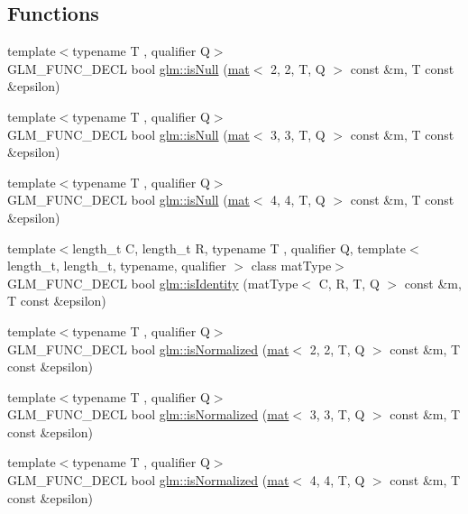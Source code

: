 \subsection*{Functions}
\begin{DoxyCompactItemize}
\item 
{\footnotesize template$<$typename T , qualifier Q$>$ }\\G\+L\+M\+\_\+\+F\+U\+N\+C\+\_\+\+D\+E\+CL bool \hyperlink{group__gtx__matrix__query_ga9790ec222ce948c0ff0d8ce927340dba}{glm\+::is\+Null} (\hyperlink{structglm_1_1mat}{mat}$<$ 2, 2, T, Q $>$ const \&m, T const \&epsilon)
\item 
{\footnotesize template$<$typename T , qualifier Q$>$ }\\G\+L\+M\+\_\+\+F\+U\+N\+C\+\_\+\+D\+E\+CL bool \hyperlink{group__gtx__matrix__query_gae14501c6b14ccda6014cc5350080103d}{glm\+::is\+Null} (\hyperlink{structglm_1_1mat}{mat}$<$ 3, 3, T, Q $>$ const \&m, T const \&epsilon)
\item 
{\footnotesize template$<$typename T , qualifier Q$>$ }\\G\+L\+M\+\_\+\+F\+U\+N\+C\+\_\+\+D\+E\+CL bool \hyperlink{group__gtx__matrix__query_ga2b98bb30a9fefa7cdea5f1dcddba677b}{glm\+::is\+Null} (\hyperlink{structglm_1_1mat}{mat}$<$ 4, 4, T, Q $>$ const \&m, T const \&epsilon)
\item 
{\footnotesize template$<$length\+\_\+t C, length\+\_\+t R, typename T , qualifier Q, template$<$ length\+\_\+t, length\+\_\+t, typename, qualifier $>$ class mat\+Type$>$ }\\G\+L\+M\+\_\+\+F\+U\+N\+C\+\_\+\+D\+E\+CL bool \hyperlink{group__gtx__matrix__query_gaee935d145581c82e82b154ccfd78ad91}{glm\+::is\+Identity} (mat\+Type$<$ C, R, T, Q $>$ const \&m, T const \&epsilon)
\item 
{\footnotesize template$<$typename T , qualifier Q$>$ }\\G\+L\+M\+\_\+\+F\+U\+N\+C\+\_\+\+D\+E\+CL bool \hyperlink{group__gtx__matrix__query_gae785af56f47ce220a1609f7f84aa077a}{glm\+::is\+Normalized} (\hyperlink{structglm_1_1mat}{mat}$<$ 2, 2, T, Q $>$ const \&m, T const \&epsilon)
\item 
{\footnotesize template$<$typename T , qualifier Q$>$ }\\G\+L\+M\+\_\+\+F\+U\+N\+C\+\_\+\+D\+E\+CL bool \hyperlink{group__gtx__matrix__query_gaa068311695f28f5f555f5f746a6a66fb}{glm\+::is\+Normalized} (\hyperlink{structglm_1_1mat}{mat}$<$ 3, 3, T, Q $>$ const \&m, T const \&epsilon)
\item 
{\footnotesize template$<$typename T , qualifier Q$>$ }\\G\+L\+M\+\_\+\+F\+U\+N\+C\+\_\+\+D\+E\+CL bool \hyperlink{group__gtx__matrix__query_ga4d9bb4d0465df49fedfad79adc6ce4ad}{glm\+::is\+Normalized} (\hyperlink{structglm_1_1mat}{mat}$<$ 4, 4, T, Q $>$ const \&m, T const \&epsilon)

\end{DoxyCompactItemize}
